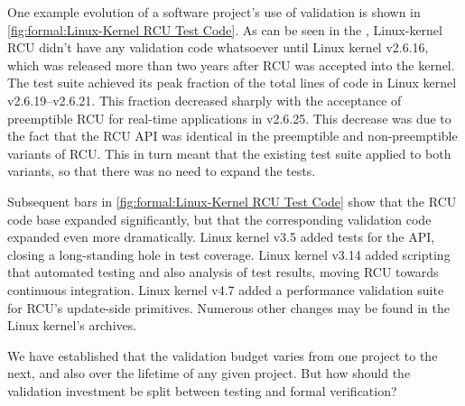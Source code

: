 
One example evolution of a software project's use of validation is
shown in
\cref{fig:formal:Linux-Kernel RCU Test Code}.
As can be seen in the ,
Linux-kernel RCU didn't have any validation code whatsoever until Linux
kernel v2.6.16, which was released more than two years after RCU was
accepted into the kernel.
The test suite achieved its peak fraction of the total lines of code
in Linux kernel v2.6.19--v2.6.21.
This fraction decreased sharply with the acceptance of preemptible RCU
for real-time applications in v2.6.25.
This decrease was due to the fact that the RCU API was identical
in the preemptible and non-preemptible variants of RCU.
This in turn meant that the existing test suite applied to both variants,
so that there was no need to expand the tests.

Subsequent bars in \cref{fig:formal:Linux-Kernel RCU Test Code} show
that the RCU code base expanded significantly, but that the
corresponding validation code expanded even more dramatically.
Linux kernel v3.5 added tests for the  API, closing
a long-standing hole in test coverage.
Linux kernel v3.14 added scripting that automated testing and also
analysis of test results, moving RCU towards continuous integration.
Linux kernel v4.7 added a performance validation suite for RCU's update-side
primitives.
Numerous other changes may be found in the Linux kernel's  archives.

We have established that the validation budget varies from one project
to the next, and also over the lifetime of any given project.
But how should the validation investment be split between testing and
formal verification?


